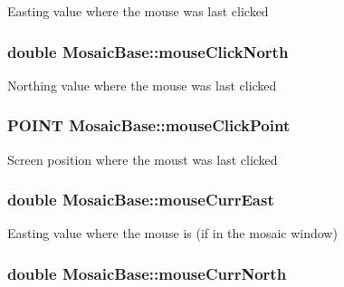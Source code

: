 \label{class_mosaic_base_a3912a0636e2b6f62a841deddb077fc4e}
Easting value where the mouse was last clicked \hypertarget{class_mosaic_base_a1e81373afe810ac058ae8ef28dd12b16}{
\subsubsection[{mouseClickNorth}]{\setlength{\rightskip}{0pt plus 5cm}double {\bf MosaicBase::mouseClickNorth}}}
\label{class_mosaic_base_a1e81373afe810ac058ae8ef28dd12b16}
Northing value where the mouse was last clicked \hypertarget{class_mosaic_base_a9ece442dc14d54587bdbc3dabdace5c2}{
\subsubsection[{mouseClickPoint}]{\setlength{\rightskip}{0pt plus 5cm}POINT {\bf MosaicBase::mouseClickPoint}}}
\label{class_mosaic_base_a9ece442dc14d54587bdbc3dabdace5c2}
Screen position where the moust was last clicked \hypertarget{class_mosaic_base_a12652beb1b47d423245ff09bf57a1161}{
\subsubsection[{mouseCurrEast}]{\setlength{\rightskip}{0pt plus 5cm}double {\bf MosaicBase::mouseCurrEast}}}
\label{class_mosaic_base_a12652beb1b47d423245ff09bf57a1161}
Easting value where the mouse is (if in the mosaic window) \hypertarget{class_mosaic_base_a6c6508870f5713bbccb1363e6795c27d}{
\subsubsection[{mouseCurrNorth}]{\setlength{\rightskip}{0pt plus 5cm}double {\bf MosaicBase::mouseCurrNorth}}}
